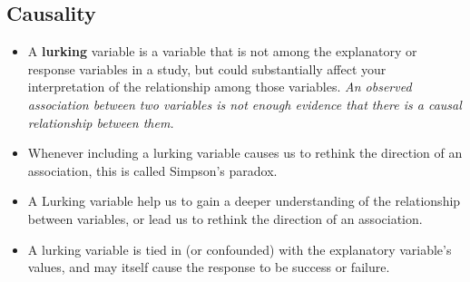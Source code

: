 \documentclass[10pt, a4paper]{article}
\begin{document}
\subsection{Causality}
\begin{itemize}
\item A \textbf{lurking} variable is a variable that is not among the explanatory or response variables in a study, but could substantially affect your interpretation of the relationship among those variables. \emph{An observed association between two variables is not enough evidence that there is a causal relationship between them.}
\item Whenever including a lurking variable causes us to rethink the direction of an association, this is called Simpson's paradox.
\item A Lurking variable help us to gain a deeper understanding of the relationship between variables, or lead us to rethink the direction of an association.
\item A lurking variable is tied in (or confounded) with the explanatory variable's values, and may itself cause the response to be success or failure. 
\end{itemize}
\end{document}
